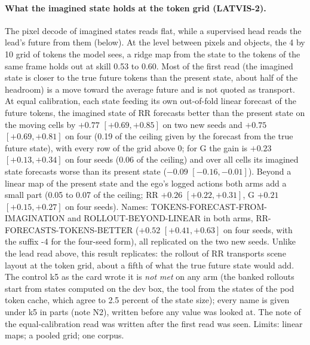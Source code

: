 \paragraph{What the imagined state holds at the token grid (LATVIS-2).} The pixel decode of imagined states reads flat, while a supervised head reads the lead's future from them (below). At the level between pixels and objects, the 4 by 10 grid of tokens the model sees, a ridge map from the state to the tokens of the same frame holds out at skill 0.53 to 0.60. Most of the first read (the imagined state is closer to the true future tokens than the present state, about half of the headroom) is a move toward the average future and is not quoted as transport. At equal calibration, each state feeding its own out-of-fold linear forecast of the future tokens, the imagined state of RR forecasts better than the present state on the moving cells by $+0.77$ $[+0.69,+0.85]$ on two new seeds and $+0.75$ $[+0.69,+0.81]$ on four (0.19 of the ceiling given by the forecast from the true future state), with every row of the grid above 0; for G the gain is $+0.23$ $[+0.13,+0.34]$ on four seeds (0.06 of the ceiling) and over all cells its imagined state forecasts worse than its present state ($-0.09$ $[-0.16,-0.01]$). Beyond a linear map of the present state and the ego's logged actions both arms add a small part (0.05 to 0.07 of the ceiling; RR $+0.26$ $[+0.22,+0.31]$, G $+0.21$ $[+0.15,+0.27]$ on four seeds). Names: TOKENS-FORECAST-FROM-IMAGINATION and ROLLOUT-BEYOND-LINEAR in both arms, RR-FORECASTS-TOKENS-BETTER ($+0.52$ $[+0.41,+0.63]$ on four seeds, with the suffix -4 for the four-seed form), all replicated on the two new seeds. Unlike the lead read above, this result replicates: the rollout of RR transports scene layout at the token grid, about a fifth of what the true future state would add. The control k5 as the card wrote it is \emph{not met} on any arm (the banked rollouts start from states computed on the dev box, the tool from the states of the pod token cache, which agree to 2.5 percent of the state size); every name is given under k5 in parts (note N2), written before any value was looked at. The note of the equal-calibration read was written after the first read was seen. Limits: linear maps; a pooled grid; one corpus.

